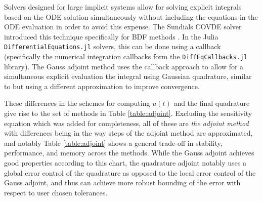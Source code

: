Solvers designed for large implicit systems allow for solving explicit integrals based on the ODE solution simultaneously without including the equations in the ODE evaluation in order to avoid this expense. 
The Sundials COVDE solver introduced this technique specifically for BDF methods \cite{SUNDIALS-hindmarsh2005sundials}. 
In the Julia \texttt{DifferentialEquations.jl} solvers, this can be done using a callback (specifically the numerical integration callbacks form the \texttt{DiffEqCallbacks.jl} library). 
The Gauss adjoint method uses the callback approach to allow for a simultaneous explicit evaluation the integral using Gaussian quadrature, similar to \cite{Norcliffe_gaussquadrature_2023} but using a different approximation to improve convergence.

These differences in the schemes for computing $u(t)$ and the final quadrature give rise to the set of methods in Table \ref{table:adjoint}. 
Excluding the sensitivity equation which was added for completeness, all of these are \textit{the adjoint method} with differences being in the way steps of the adjoint method are approximated, and notably Table \ref{table:adjoint} shows a general trade-off in stability, performance, and memory across the methods. 
While the Gauss adjoint achieves good properties according to this chart, the quadrature adjoint notably uses a global error control of the quadrature as opposed to the local error control of the Gauss adjoint, and thus can achieve more robust bounding of the error with respect to user chosen tolerances.

